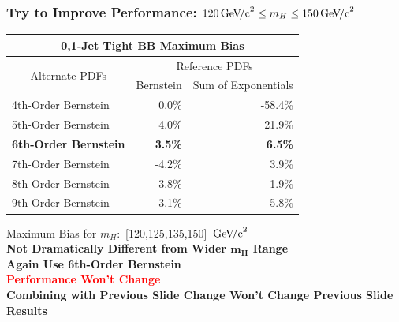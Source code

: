\documentclass{beamer}
\newcommand{\GeVcc}{\ensuremath{\,\mathrm{Ge\kern -0.1em V\!/c}^2}}
\newcommand{\tredbf}[1]{\textcolor{red}{\bf #1}}
\begin{document}
\begin{frame}
\frametitle{Try to Improve Performance: $120\GeVcc{}\leq m_H\leq150\GeVcc{}$}
\scriptsize
\begin{center}

\begin{tabular}{|l|r|r|} \hline 
\multicolumn{3}{|c|}{ \bf 0,1-Jet Tight BB Maximum Bias} \\ \hline
\multicolumn{1}{|c|}{\multirow{2}{*}{Alternate PDFs}} & \multicolumn{2}{c|}{Reference PDFs} \\ \cline{2-3} 
& \multicolumn{1}{c|}{      Bernstein} & \multicolumn{1}{c|}{Sum of Exponentials} \\ \hline
4th-Order Bernstein &            0.0\% &          -58.4\% \\ \hline
5th-Order Bernstein &            4.0\% &           21.9\% \\ \hline
\textbf{6th-Order Bernstein} &   \textbf{         3.5\%} &    \textbf{        6.5\%} \\ \hline
7th-Order Bernstein &           -4.2\% &            3.9\% \\ \hline
8th-Order Bernstein &           -3.8\% &            1.9\% \\ \hline
9th-Order Bernstein &           -3.1\% &            5.8\% \\ \hline
\end{tabular}

\small
\vspace{1em}
Maximum Bias for $m_H:$ [120,125,135,150] \GeVcc{}
\\
\bf
Not Dramatically Different from Wider $\bm{m_H}$ Range
\\
Again Use 6th-Order Bernstein
\\
\tredbf{Performance Won't Change}
\\
Combining with Previous Slide Change Won't Change Previous Slide Results
\end{center}
\end{frame}


\end{document}
